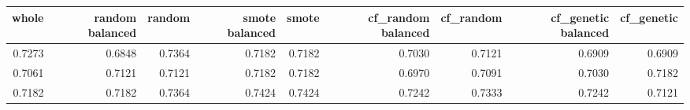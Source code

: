 \begin{tabular}{rrrrrrrrr}
\toprule

 whole &  random balanced &  random &  smote balanced &  smote &  cf\_random balanced &  cf\_random &  cf\_genetic balanced &  cf\_genetic \\
\midrule

0.7273 &           0.6848 &  0.7364 &          0.7182 & 0.7182 &              0.7030 &     0.7121 &               0.6909 &      0.6909 \\
0.7061 &           0.7121 &  0.7121 &          0.7182 & 0.7182 &              0.6970 &     0.7091 &               0.7030 &      0.7182 \\
0.7182 &           0.7182 &  0.7364 &          0.7424 & 0.7424 &              0.7242 &     0.7333 &               0.7242 &      0.7121 \\

\bottomrule
\end{tabular}
